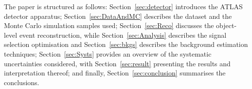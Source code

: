 The paper is structured as follows: Section~\ref{sec:detector} introduces the ATLAS detector apparatus; Section~\ref{sec:DataAndMC} describes the dataset and the Monte Carlo simulation samples used; Section~\ref{sec:Reco} discusses the object-level event reconstruction, while Section~\ref{sec:Analysis} describes the signal selection optimisation and Section~\ref{sec:bkgs} describes the background estimation techniques; Section~\ref{sec:Systs} provides an overview of the systematic uncertainties considered, with Section~\ref{sec:result} presenting the results and interpretation thereof; and finally, Section~\ref{sec:conclusion} summarises the conclusions. 

